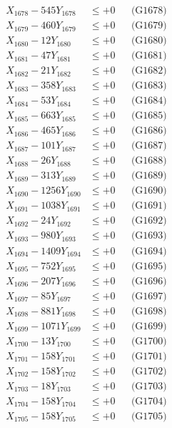 \documentclass[a4paper,10pt]{article}
\begin{document}
{\begin{align}
X_{1678} - 545Y_{1678} &\leq +0 && \text{(G1678)} \\
X_{1679} - 460Y_{1679} &\leq +0 && \text{(G1679)} \\
X_{1680} - 12Y_{1680} &\leq +0 && \text{(G1680)} \\
\allowbreak
X_{1681} - 47Y_{1681} &\leq +0 && \text{(G1681)} \\
X_{1682} - 21Y_{1682} &\leq +0 && \text{(G1682)} \\
X_{1683} - 358Y_{1683} &\leq +0 && \text{(G1683)} \\
X_{1684} - 53Y_{1684} &\leq +0 && \text{(G1684)} \\
X_{1685} - 663Y_{1685} &\leq +0 && \text{(G1685)} \\
X_{1686} - 465Y_{1686} &\leq +0 && \text{(G1686)} \\
X_{1687} - 101Y_{1687} &\leq +0 && \text{(G1687)} \\
X_{1688} - 26Y_{1688} &\leq +0 && \text{(G1688)} \\
X_{1689} - 313Y_{1689} &\leq +0 && \text{(G1689)} \\
X_{1690} - 1256Y_{1690} &\leq +0 && \text{(G1690)} \\
\allowbreak
X_{1691} - 1038Y_{1691} &\leq +0 && \text{(G1691)} \\
X_{1692} - 24Y_{1692} &\leq +0 && \text{(G1692)} \\
X_{1693} - 980Y_{1693} &\leq +0 && \text{(G1693)} \\
X_{1694} - 1409Y_{1694} &\leq +0 && \text{(G1694)} \\
X_{1695} - 752Y_{1695} &\leq +0 && \text{(G1695)} \\
X_{1696} - 207Y_{1696} &\leq +0 && \text{(G1696)} \\
X_{1697} - 85Y_{1697} &\leq +0 && \text{(G1697)} \\
X_{1698} - 881Y_{1698} &\leq +0 && \text{(G1698)} \\
X_{1699} - 1071Y_{1699} &\leq +0 && \text{(G1699)} \\
X_{1700} - 13Y_{1700} &\leq +0 && \text{(G1700)} \\
\allowbreak
X_{1701} - 158Y_{1701} &\leq +0 && \text{(G1701)} \\
X_{1702} - 158Y_{1702} &\leq +0 && \text{(G1702)} \\
X_{1703} - 18Y_{1703} &\leq +0 && \text{(G1703)} \\
X_{1704} - 158Y_{1704} &\leq +0 && \text{(G1704)} \\
X_{1705} - 158Y_{1705} &\leq +0 && \text{(G1705)} \\

\end{align}}
\end{document}
